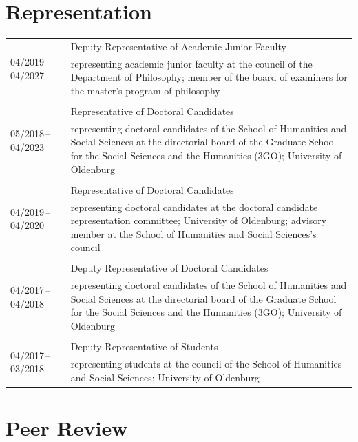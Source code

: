 \documentclass[a4paper,10pt]{article}
\begin{document}
\section{Representation}
\begin{longtable}{p{2.5cm}p{11cm}}
\multirow{2}{2.5cm}{\footnotesize{04/2019\,--\,04/2027}} & Deputy Representative of Academic Junior Faculty\\
& \footnotesize{representing academic junior faculty at the council of the Department of Philosophy; member of the board of examiners for the master's program of philosophy}\\
\\
\multirow{2}{2.5cm}{\footnotesize{05/2018\,--\,04/2023}} & Representative of Doctoral Candidates\\
& \footnotesize{representing doctoral candidates of the School of Humanities and Social Sciences at the directorial board of the Graduate School for the Social Sciences and the Humanities (3GO); University of Oldenburg}\\
\\
\multirow{2}{2.5cm}{\footnotesize{04/2019\,--\,04/2020}} & Representative of Doctoral Candidates\\
& \footnotesize{representing doctoral candidates at the doctoral candidate representation committee; University of Oldenburg; advisory member at the School of Humanities and Social Sciences's council}\\
\\
\multirow{2}{2.5cm}{\footnotesize{04/2017\,--\,04/2018}} & Deputy Representative of Doctoral Candidates\\
& \footnotesize{representing doctoral candidates of the School of Humanities and Social Sciences at the directorial board of the Graduate School for the Social Sciences and the Humanities (3GO); University of Oldenburg}\\
\\
\multirow{2}{2.5cm}{\footnotesize{04/2017\,--\,03/2018}} & Deputy Representative of Students\\
& \footnotesize{representing students at the council of the School of Humanities and Social Sciences; University of Oldenburg}\\
\end{longtable}


\clearpage
\section{Peer Review}
\end{document}
